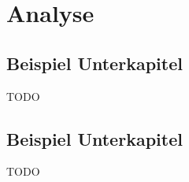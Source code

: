 \chapter{Analyse}

\section{Beispiel Unterkapitel}
TODO \cite{LSVRC}

\section{Beispiel Unterkapitel}
TODO